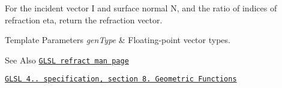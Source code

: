 For the incident vector I and surface normal N, and the ratio of indices of refraction eta, return the refraction vector. 


\begin{DoxyTemplParams}{Template Parameters}
{\em gen\-Type} & Floating-\/point vector types.\\
\hline
\end{DoxyTemplParams}
\begin{DoxySeeAlso}{See Also}
\href{http://www.opengl.org/sdk/docs/manglsl/xhtml/refract.xml}{\tt G\-L\-S\-L refract man page} 

\href{http://www.opengl.org/registry/doc/GLSLangSpec.4.20.8.pdf}{\tt G\-L\-S\-L 4.. specification, section 8. Geometric Functions} 
\end{DoxySeeAlso}

